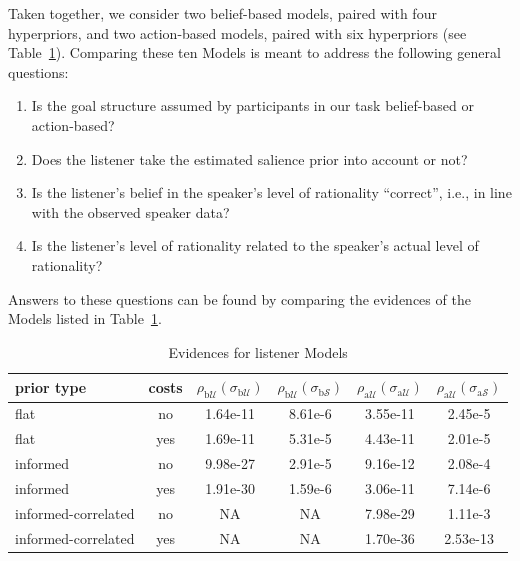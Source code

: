 Taken together, we consider two belief-based models, paired with four
hyperpriors, and two action-based models, paired with six hyperpriors
(see Table~\ref{table:listener mod}). Comparing these ten Models is
meant to address the following general questions:
\begin{enumerate}
\item Is the goal structure assumed by participants in our task
  belief-based or action-based?
\item Does the listener take the estimated salience prior into account
  or not?
\item Is the listener's belief in the speaker's level of rationality
  ``correct'', i.e., in line with the observed speaker data?
\item Is the listener's level of rationality related to the speaker's
  actual level of rationality?
\end{enumerate}

Answers to these questions can be found by comparing the evidences of
the Models listed in Table~\ref{table:listener mod}.
%
\begin{table}[htb] 
\caption{Evidences for listener Models}
  \centering 
  \begin{tabular}{lccccc}
    prior type & costs &
    $\rho_{\mathrm{b}\mathcal{U}}(\sigma_{\mathrm{b}\mathcal{U}})$ 
    & $\rho_{\mathrm{b}\mathcal{U}}(\sigma_{\mathrm{b}\mathcal{S}})$
    & $\rho_{\mathrm{a}\mathcal{U}}(\sigma_{\mathrm{a}\mathcal{U}})$
    & $\rho_{\mathrm{a}\mathcal{U}}(\sigma_{\mathrm{a}\mathcal{S}})$
    \\ \midrule
    flat
    & no
    & 1.64e-11
    & 8.61e-6
    & 3.55e-11
    & 2.45e-5
    \\ 
    flat
    & yes
    & 1.69e-11
    & 5.31e-5
    & 4.43e-11
    & 2.01e-5
    \\ \addlinespace[0.1cm]
    informed
    & no
    & 9.98e-27
    & 2.91e-5
    & 9.16e-12
    & 2.08e-4
    \\
    informed
    & yes
    & 1.91e-30
    & 1.59e-6
    & 3.06e-11
    & 7.14e-6
    \\ \addlinespace[0.1cm]
    informed-correlated
    & no
    & NA
    & NA
    & 7.98e-29
    & 1.11e-3
    \\
    informed-correlated
    & yes
    & NA
    & NA
    & 1.70e-36
    & 2.53e-13
    \\
  \end{tabular}
  \label{table:listener mod}
\end{table}

